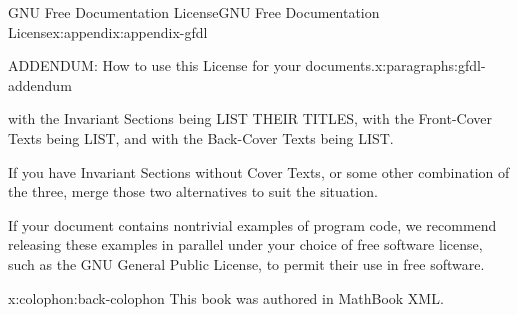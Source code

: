 \documentclass[oneside,10pt,]{book}
\newcommand{\xreffont}{\relax}
\begin{document}
\begin{appendixptx}{GNU Free Documentation License}{}{GNU Free Documentation License}{}{}{x:appendix:appendix-gfdl}
\begin{paragraphs}{ADDENDUM: How to use this License for your documents.}{x:paragraphs:gfdl-addendum}
\begin{preformatted}
with the Invariant Sections being LIST THEIR TITLES, with
       the Front-Cover Texts being LIST, and with the Back-Cover Texts
       being LIST.
\end{preformatted}
If you have Invariant Sections without Cover Texts, or some other combination of the three, merge those two alternatives to suit the situation.%
\par
If your document contains nontrivial examples of program code, we recommend releasing these examples in parallel under your choice of free software license, such as the GNU General Public License, to permit their use in free software.%
\end{paragraphs}%
\end{appendixptx}
%
\backmatter
%
%
{\xreffont\printindex}
%
\cleardoublepage
\pagestyle{empty}
\begin{backcolophon}{x:colophon:back-colophon}%
This book was authored in MathBook XML.%
\end{backcolophon}%
\cleardoublepage%
%
\end{document}
